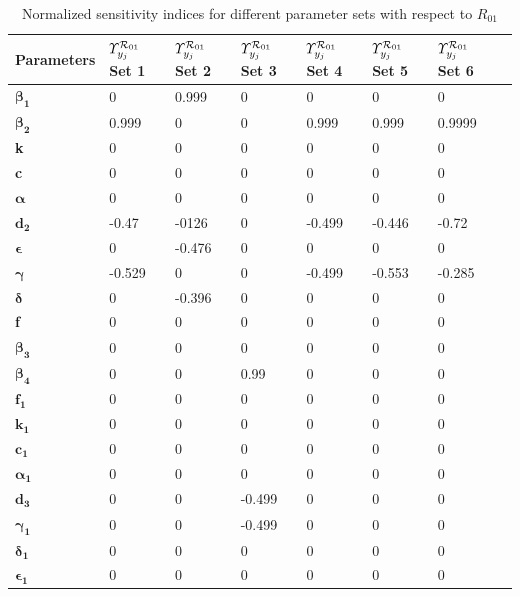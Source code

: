\begin{table}
\centering
    \begin{tabular}{|p{3cm}|p{1.6cm}|p{1.6cm}|p{1.6cm}|p{1.6cm}|p{1.6cm}|p{1.6cm}|p{1.6cm}|}
    \hline
               Parameters      & \textbf{$\varUpsilon^{{{\cal R}}_{01}}_{y_j}$ Set 1} & \textbf{$\varUpsilon^{{{\cal R}}_{01}}_{y_j}$ Set 2} & \textbf{$\varUpsilon^{{{\cal R}}_{01}}_{y_j}$ Set 3} & \textbf{$\varUpsilon^{{{\cal R}}_{01}}_{y_j}$ Set 4} & \textbf{$\varUpsilon^{{{\cal R}}_{01}}_{y_j}$ Set 5} & \textbf{$\varUpsilon^{{{\cal R}}_{01}}_{y_j}$ Set 6} \\
            \hline
  $\boldsymbol {\beta_{1}} $                 & 0 & 0.999 & 0 & 0 & 0 & 0  \\
  $\boldsymbol {\beta_{2}} $      & 0.999 & 0 & 0 & 0.999 & 0.999 & 0.9999  \\
  \textbf {k}       & 0 & 0 & 0 & 0 & 0 & 0  \\
  \textbf{c}                & 0 & 0 & 0 & 0 & 0 & 0  \\
  $\boldsymbol{\alpha}$          & 0 & 0 & 0 & 0 & 0 & 0  \\
  $\mathbf {d _{2} }$           & -0.47 & -0126 & 0 & -0.499 & -0.446 & -0.72  \\
  $\boldsymbol{\epsilon}$          & 0 & -0.476 & 0 & 0 & 0 & 0  \\
  $\boldsymbol{\gamma}$                & -0.529 & 0 & 0 & -0.499 & -0.553 & -0.285  \\
  $\boldsymbol{\delta}$        & 0 & -0.396 & 0 & 0 & 0 & 0  \\
  \textbf{f}           & 0 & 0 & 0 & 0 & 0 & 0  \\
  $\boldsymbol {\beta_{3}}$          & 0 & 0 & 0 & 0 & 0 & 0  \\
  $\boldsymbol {\beta_{4}}$             & 0 & 0 & 0.99 & 0 & 0 & 0  \\
  $\mathbf{f_{1} } $         & 0 & 0 & 0 & 0 & 0 & 0  \\
  $\mathbf{k_{1} }  $        & 0 & 0 & 0 & 0 & 0 & 0  \\
  $\mathbf{c_{1} } $         & 0 & 0 & 0 & 0 & 0 & 0  \\
  $\boldsymbol {\alpha_{1}}$          & 0 & 0 & 0 & 0 & 0 & 0  \\
  $\mathbf{d_{3}}$          & 0 & 0 & -0.499 & 0 & 0 & 0  \\
  $\boldsymbol {\gamma_{1}}$          & 0 & 0 & -0.499 & 0 & 0 & 0  \\
  $\boldsymbol {\delta_{1}}$         & 0 & 0 & 0 & 0 & 0 & 0  \\
  $\boldsymbol {\epsilon_{1}}$          & 0 & 0 & 0 & 0 & 0 & 0  \\
  \hline
    \end{tabular}
\caption{Normalized sensitivity indices for different parameter sets with respect to $R_{01}$}\label{T2}
\end{table}
